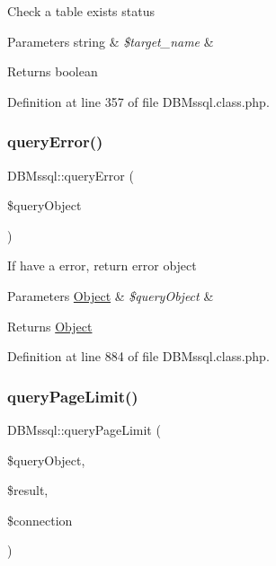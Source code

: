 Check a table exists status 
\begin{DoxyParams}[1]{Parameters}
string & {\em \$target\+\_\+name} & \\
\hline
\end{DoxyParams}
\begin{DoxyReturn}{Returns}
boolean 
\end{DoxyReturn}


Definition at line 357 of file D\+B\+Mssql.\+class.\+php.

\mbox{\label{classDBMssql_adeea6fd6090140a4b81051c5ff68cdfe}} 
\subsubsection{\texorpdfstring{query\+Error()}{queryError()}}
{\footnotesize\ttfamily D\+B\+Mssql\+::query\+Error (\begin{DoxyParamCaption}\item[{}]{\$query\+Object }\end{DoxyParamCaption})}

If have a error, return error object 
\begin{DoxyParams}[1]{Parameters}
\hyperlink{classObject}{Object} & {\em \$query\+Object} & \\
\hline
\end{DoxyParams}
\begin{DoxyReturn}{Returns}
\hyperlink{classObject}{Object} 
\end{DoxyReturn}


Definition at line 884 of file D\+B\+Mssql.\+class.\+php.

\mbox{\label{classDBMssql_a5a63ce969c396b656ac50e2251e798b9}} 
\subsubsection{\texorpdfstring{query\+Page\+Limit()}{queryPageLimit()}}
{\footnotesize\ttfamily D\+B\+Mssql\+::query\+Page\+Limit (\begin{DoxyParamCaption}\item[{}]{\$query\+Object,  }\item[{}]{\$result,  }\item[{}]{\$connection }\end{DoxyParamCaption})}

